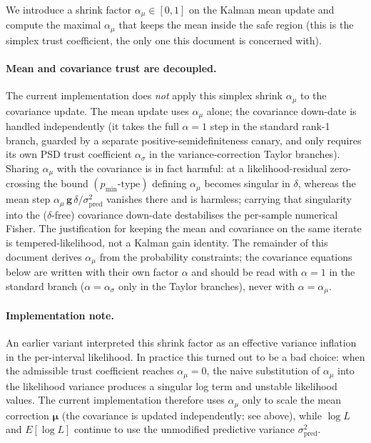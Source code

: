 \documentclass[11pt]{article}
\begin{document}
We introduce a shrink factor \(\alpha_\mu\in[0,1]\) on the Kalman mean update
and compute the maximal \(\alpha_\mu\) that keeps the mean inside the safe
region (this is the simplex trust coefficient, the only one this document is
concerned with).

\paragraph{Mean and covariance trust are decoupled.}
The current implementation does \emph{not} apply this simplex shrink
\(\alpha_\mu\) to the covariance update. The mean update uses \(\alpha_\mu\)
alone; the covariance down-date is handled independently (it takes the full
\(\alpha=1\) step in the standard rank-1 branch, guarded by a separate
positive-semidefiniteness canary, and only requires its own PSD trust
coefficient \(\alpha_\sigma\) in the variance-correction Taylor branches).
Sharing \(\alpha_\mu\) with the covariance is in fact harmful: at a
likelihood-residual zero-crossing the bound \((p_{\min}\text{-type})\) defining
\(\alpha_\mu\) becomes singular in \(\delta\), whereas the mean step
\(\alpha_\mu\,\mathbf{g}\,\delta/\sigma^2_{\text{pred}}\) vanishes there and is
harmless; carrying that singularity into the (\(\delta\)-free) covariance
down-date destabilises the per-sample numerical Fisher. The justification for
keeping the mean and covariance on the same iterate is tempered-likelihood, not
a Kalman gain identity. The remainder of this document derives \(\alpha_\mu\)
from the probability constraints; the covariance equations below are written
with their own factor \(\alpha\) and should be read with \(\alpha=1\) in the
standard branch (\(\alpha=\alpha_\sigma\) only in the Taylor branches), never
with \(\alpha=\alpha_\mu\).

\paragraph{Implementation note.}
An earlier variant interpreted this shrink factor as an effective variance
inflation in the per-interval likelihood. In practice this turned out to be a
bad choice: when the admissible trust coefficient reaches \(\alpha_\mu=0\), the
naive substitution of \(\alpha_\mu\) into the likelihood variance produces a
singular log term and unstable likelihood values. The current implementation
therefore uses \(\alpha_\mu\) only to scale the mean correction
\(\boldsymbol{\mu}\) (the covariance is updated independently; see above), while
\(\log L\) and \(E[\log L]\) continue to use the unmodified predictive variance
\(\sigma^2_{\text{pred}}\).
\end{document}
